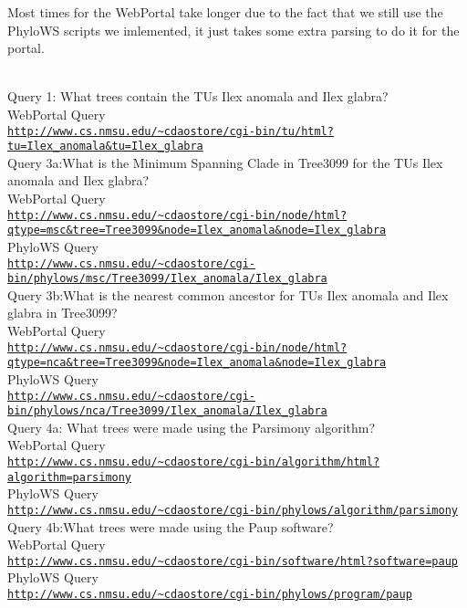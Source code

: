 \documentclass[10pt]{article}
\begin{document}
Most times for the WebPortal take longer due to the fact that we still use the PhyloWS scripts we imlemented, it just takes some extra parsing to do it for the portal.

\\
Query 1: What trees contain the TUs Ilex anomala and Ilex glabra?
\\ WebPortal Query \\
{\tt \url{http://www.cs.nmsu.edu/~cdaostore/cgi-bin/tu/html?tu=Ilex_anomala&tu=Ilex_glabra}}
\\

Query 3a:What is the Minimum Spanning Clade in Tree3099 for the TUs Ilex anomala and Ilex glabra?\\
 WebPortal Query \\
{\tt \url{http://www.cs.nmsu.edu/~cdaostore/cgi-bin/node/html?qtype=msc&tree=Tree3099&node=Ilex_anomala&node=Ilex_glabra}}
\\PhyloWS Query\\
{\tt \url{http://www.cs.nmsu.edu/~cdaostore/cgi-bin/phylows/msc/Tree3099/Ilex_anomala/Ilex_glabra}}
\\

Query 3b:What is the nearest common ancestor for TUs Ilex anomala and Ilex glabra in Tree3099?\\
 WebPortal Query \\
{\tt \url{http://www.cs.nmsu.edu/~cdaostore/cgi-bin/node/html?qtype=nca&tree=Tree3099&node=Ilex_anomala&node=Ilex_glabra}}
\\PhyloWS Query\\
{\tt \url{http://www.cs.nmsu.edu/~cdaostore/cgi-bin/phylows/nca/Tree3099/Ilex_anomala/Ilex_glabra}}
\\

Query 4a: What trees were made using the Parsimony algorithm?
\\ WebPortal Query \\
{\tt \url{http://www.cs.nmsu.edu/~cdaostore/cgi-bin/algorithm/html?algorithm=parsimony}}
\\PhyloWS Query\\
{\tt \url{http://www.cs.nmsu.edu/~cdaostore/cgi-bin/phylows/algorithm/parsimony}}
\\

Query 4b:What trees were made using the Paup software?\\
 WebPortal Query \\
{\tt \url{http://www.cs.nmsu.edu/~cdaostore/cgi-bin/software/html?software=paup}}
\\PhyloWS Query\\
{\tt \url{http://www.cs.nmsu.edu/~cdaostore/cgi-bin/phylows/program/paup}}
\\
\end{document}
